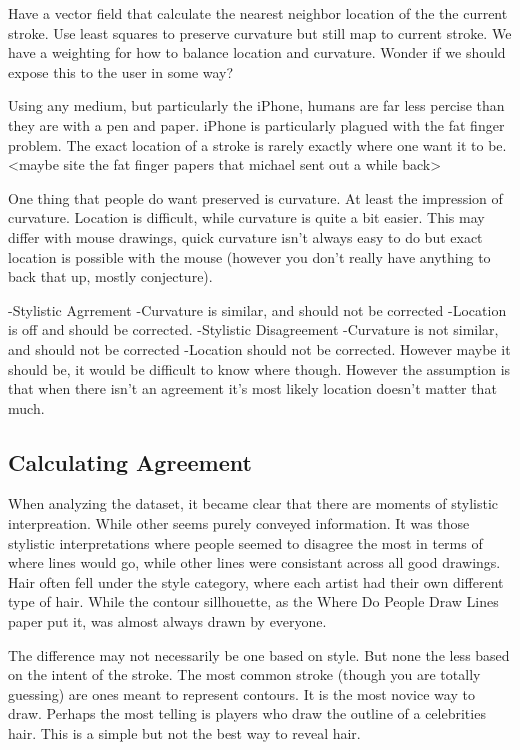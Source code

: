 
Have a vector field that calculate the nearest neighbor location of the the current stroke.
Use least squares to preserve curvature but still map to current stroke.
We have a weighting for how to balance location and curvature. Wonder if we should expose this to the user in some way?


Using any medium, but particularly the iPhone, humans are far less percise than they are with a pen and paper. iPhone is particularly plagued with the fat finger problem. The exact location of a stroke is rarely exactly where one want it to be. <maybe site the fat finger papers that michael sent out a while back> 

One thing that people do want preserved is curvature. At least the impression of curvature. Location is difficult, while curvature is quite a bit easier. This may differ with mouse drawings, quick curvature isn't always easy to do but exact location is possible with the mouse (however you don't really have anything to back that up, mostly conjecture).

-Stylistic Agrrement
	-Curvature is similar, and should not be corrected
	-Location is off and should be corrected.
-Stylistic Disagreement
	-Curvature is not similar, and should not be corrected
	-Location should not be corrected. However maybe it should be, it would be difficult to know where though. However the assumption is that when there isn't an agreement it's most likely location doesn't matter that much.

\subsection{Calculating Agreement}
When analyzing the dataset, it became clear that there are moments of stylistic interpreation. While other seems purely conveyed information. It was those stylistic interpretations where people seemed to disagree the most in terms of where lines would go, while other lines were consistant across all good drawings. Hair often fell under the style category, where each artist had their own different type of hair. While the contour sillhouette, as the Where Do People Draw Lines paper put it, was almost always drawn by everyone. 

The difference may not necessarily be one based on style. But none the less based on the intent of the stroke. The most common stroke (though you are totally guessing) are ones meant to represent contours. It is the most novice way to draw. Perhaps the most telling is players who draw the outline of a celebrities hair. This is a simple but not the best way to reveal hair. 

